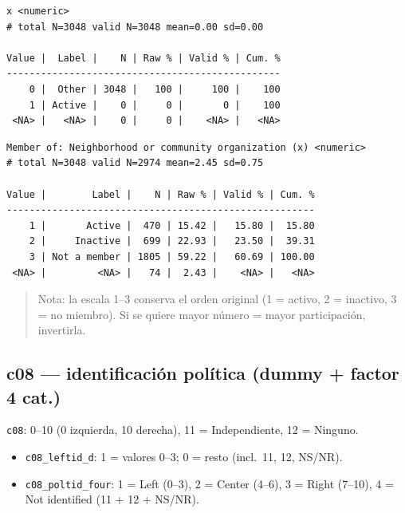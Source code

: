 \documentclass[
  letterpaper,
  DIV=11,
  numbers=noendperiod]{scrreprt}
\newenvironment{Shaded}{\begin{snugshade}}{\end{snugshade}}
\newcommand{\FunctionTok}[1]{\textcolor[rgb]{0.28,0.35,0.67}{#1}}
\newcommand{\NormalTok}[1]{\textcolor[rgb]{0.00,0.23,0.31}{#1}}
\newcommand{\SpecialCharTok}[1]{\textcolor[rgb]{0.37,0.37,0.37}{#1}}
\providecommand{\tightlist}{%
  \setlength{\itemsep}{0pt}\setlength{\parskip}{0pt}}
\begin{document}
\begin{verbatim}
x <numeric> 
# total N=3048 valid N=3048 mean=0.00 sd=0.00

Value |  Label |    N | Raw % | Valid % | Cum. %
------------------------------------------------
    0 |  Other | 3048 |   100 |     100 |    100
    1 | Active |    0 |     0 |       0 |    100
 <NA> |   <NA> |    0 |     0 |    <NA> |   <NA>
\end{verbatim}

\begin{Shaded}
\end{Shaded}

\begin{verbatim}
Member of: Neighborhood or community organization (x) <numeric> 
# total N=3048 valid N=2974 mean=2.45 sd=0.75

Value |        Label |    N | Raw % | Valid % | Cum. %
------------------------------------------------------
    1 |       Active |  470 | 15.42 |   15.80 |  15.80
    2 |     Inactive |  699 | 22.93 |   23.50 |  39.31
    3 | Not a member | 1805 | 59.22 |   60.69 | 100.00
 <NA> |         <NA> |   74 |  2.43 |    <NA> |   <NA>
\end{verbatim}

\begin{quote}
Nota: la escala 1--3 conserva el orden original (1 = activo, 2 =
inactivo, 3 = no miembro). Si se quiere mayor número = mayor
participación, invertirla.
\end{quote}

\subsection{c08 --- identificación política (dummy + factor 4
cat.)}\label{c08-identificaciuxf3n-poluxedtica-dummy-factor-4-cat.}

\texttt{c08}: 0--10 (0 izquierda, 10 derecha), 11 = Independiente, 12 =
Ninguno.

\begin{itemize}
\tightlist
\item
  \texttt{c08\_leftid\_d}: 1 = valores 0--3; 0 = resto (incl.~11, 12,
  NS/NR).
\item
  \texttt{c08\_poltid\_four}: 1 = Left (0--3), 2 = Center (4--6), 3 =
  Right (7--10), 4 = Not identified (11 + 12 + NS/NR).
\end{itemize}
\end{document}
